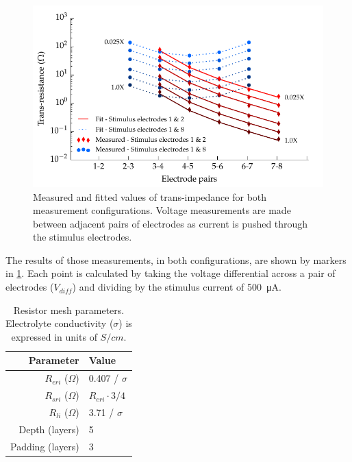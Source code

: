       \begin{figure}
        \centering
        \includegraphics{content/pt2/07-InterfaceModel/graphics/graph_transimpedance_pbs}
        \caption{\label{fig:pt2-graph_transimpedance_pbs}Measured and fitted values of trans-impedance for both measurement configurations. Voltage measurements are made between adjacent pairs of electrodes as current is pushed through the stimulus electrodes.}
      \end{figure}
      The results of those measurements, in both configurations, are shown by markers in \cref{fig:pt2-graph_transimpedance_pbs}.
      Each point is calculated by taking the voltage differential across a pair of electrodes ($V_{diff}$) and dividing by the stimulus current of \SI{500}{\micro\ampere}.
      \begin{table}
        \centering
        \begin{tabular}{r | l}
          Parameter & Value \\
          \hline
          $R_{eri}$ ($\Omega$)& 0.407 / $\sigma$\\
          $R_{sri}$ ($\Omega$)& $R_{eri}\cdot 3/4$\\
          $R_{li}$ ($\Omega$)& 3.71 / $\sigma$ \\
          Depth (layers) & 5 \\
          Padding (layers) & 3 \\
        \end{tabular}
        \caption{\label{tab:RESparams}Resistor mesh parameters. Electrolyte conductivity ($\sigma$) is expressed in units of $S / cm$.}
      \end{table}

